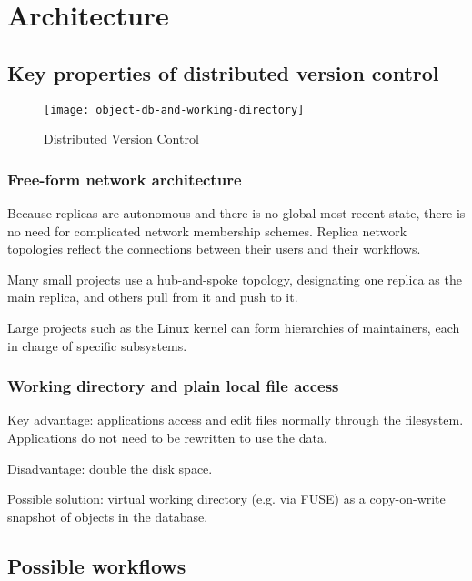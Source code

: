 \documentclass[a4paper]{article}
\begin{document}
\section{Architecture}\label{architecture}


\subsection{Key properties of distributed version control}

\begin{figure}[h!]
  \caption{Distributed Version Control}
  \label{fig:object-db-and-working-directory}
  \centering
    \texttt{[image: object-db-and-working-directory]}
\end{figure}


\subsubsection{Free-form network architecture}

Because replicas are autonomous and there is no global most-recent state, there
is no need for complicated network membership schemes. Replica network
topologies reflect the connections between their users and their workflows.

Many small projects use a hub-and-spoke topology, designating one replica as the
main replica, and others pull from it and push to it.

Large projects such as the Linux kernel can form hierarchies of maintainers,
each in charge of specific subsystems.


\subsubsection{Working directory and plain local file access}

Key advantage: applications access and edit files normally through the
filesystem. Applications do not need to be rewritten to use the data.

Disadvantage: double the disk space.

Possible solution: virtual working directory (e.g. via FUSE) as a
copy-on-write snapshot of objects in the database.


\subsection{Possible workflows}\label{possible-workflows}
\end{document}

